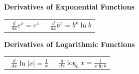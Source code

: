 \vspace{0.8em}

\noindent\textbf{Derivatives of Exponential Functions}\\
\begin{tabular}{@{}ll@{}}
	\nextitem\ $\displaystyle \frac{d}{dx}e^{x} = e^{x}$
	&
	\nextitem\ $\displaystyle \frac{d}{dx}b^{x} = b^{x}\ln b$
\end{tabular}

\vspace{0.8em}

\noindent\textbf{Derivatives of Logarithmic Functions}\\
\begin{tabular}{@{}l l@{}}
	\nextitem\ $\displaystyle \frac{d}{dx}\ln|x| = \frac{1}{x}$
	&
	\nextitem\ $\displaystyle \frac{d}{dx}\log_{b}x = \frac{1}{x\ln b}$
\end{tabular}
\clearpage

